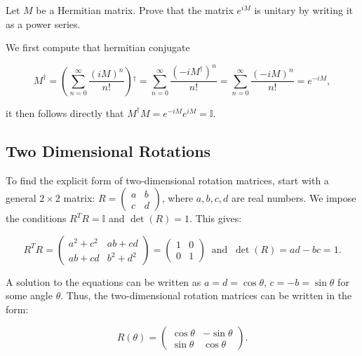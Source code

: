 \documentclass[a4paper,12pt]{report}
\begin{document}
{Let \(M\) be a Hermitian matrix. Prove that the matrix \(e^{iM} \) is unitary by writing it as a power series.}
{We first compute that hermitian conjugate 

\begin{equation}
    M^{\dagger} = \left( \sum_{n=0}^{\infty} \frac{(iM)^{n} }{n!}   \right){}^{\dagger} = \sum_{n=0}^{\infty} \frac{(-iM^{\dagger} )^{n} }{n!} = \sum_{n=0}^{\infty} \frac{(-iM)^{n} }{n!} = e^{-iM}, 
\end{equation}

it then follows directly that \(M^{\dagger} M = e^{-iM}e^{iM} = \mathbb{I}  \). 
} 




\subsection{Two Dimensional Rotations}

To find the explicit form of two-dimensional rotation matrices, start with a general \(2 \times 2\) matrix: \(R = \begin{pmatrix} a & b \\ c & d \end{pmatrix}\), where \(a, b, c, d\) are real numbers. We impose the conditions \(R^T R = \mathbb{I}\) and \(\det(R) = 1\). This gives:

\begin{equation}
R^T R = \begin{pmatrix} a^2 + c^2 & ab + cd \\ ab + cd & b^2 + d^2 \end{pmatrix} = \begin{pmatrix} 1 & 0 \\ 0 & 1 \end{pmatrix} ~\text { and }~  
\det(R) = ad - bc = 1.
\end{equation}

A solution to the equations can be written as \(a = d = \cos\theta\), \(c = -b = \sin\theta\) for some angle \(\theta\). Thus, the two-dimensional rotation matrices can be written in the form:

\begin{equation}
R(\theta) = \begin{pmatrix} \cos \theta & -\sin \theta \\ \sin \theta & \cos \theta \end{pmatrix}.
\end{equation}
\end{document}

